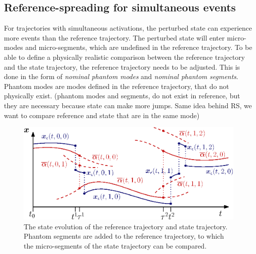 \documentclass[../DC2017114Bouma.tex]{subfiles}
\begin{document}
\subsection{Reference-spreading for simultaneous events}
For trajectories with simultaneous activations, the perturbed state can experience more events than the reference trajectory. The perturbed state will enter micro-modes and micro-segments, which are undefined in the reference trajectory. To be able to define a physically realistic comparison between the reference trajectory and the state trajectory, the reference trajectory needs to be adjusted. This is done in the form of \textit{nominal phantom modes} and \textit{nominal phantom segments}. Phantom modes are modes defined in the reference trajectory, that do not physically exist.
(phantom modes and segments, do not exist in reference, but they are necessary because state can make more jumps. Same idea behind RS, we want to compare reference and state that are in the same mode)\\
\begin{figure}[h]
\centering
\includegraphics[width=.8\textwidth]{simulmicro.eps}\caption{The state evolution of the reference trajectory and state trajectory. Phantom segments are added to the reference trajectory, to which the micro-segments of the state trajectory can be compared.}\label{fig:4simulmicro}
\end{figure}

%
%
%
%
%
%
%
%
%
\end{document}
